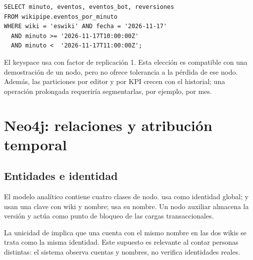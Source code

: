 \par\noindent\begin{minipage}{\linewidth}
\begin{lstlisting}[caption={Lectura de una serie temporal por su partición.}]
SELECT minuto, eventos, eventos_bot, reversiones
FROM wikipipe.eventos_por_minuto
WHERE wiki = 'eswiki' AND fecha = '2026-11-17'
  AND minuto >= '2026-11-17T10:00:00Z'
  AND minuto <  '2026-11-17T11:00:00Z';
\end{lstlisting}
\end{minipage}\par

El keyspace usa  con factor de replicación 1. Esta elección es compatible con una demostración de un nodo, pero no ofrece tolerancia a la pérdida de ese nodo. Además, las particiones por editor y por KPI crecen con el historial; una operación prolongada requeriría segmentarlas, por ejemplo, por mes.

\section{Neo4j: relaciones y atribución temporal}
\subsection{Entidades e identidad}
El modelo analítico contiene cuatro clases de nodo.  usa  como identidad global;  y  usan una clave con wiki y nombre;  usa su nombre. Un nodo auxiliar  almacena la versión y actúa como punto de bloqueo de las cargas transaccionales.

La unicidad de  implica que una cuenta con el mismo nombre en las dos wikis se trata como la misma identidad. Este supuesto es relevante al contar personas distintas: el sistema observa cuentas y nombres, no verifica identidades reales.

